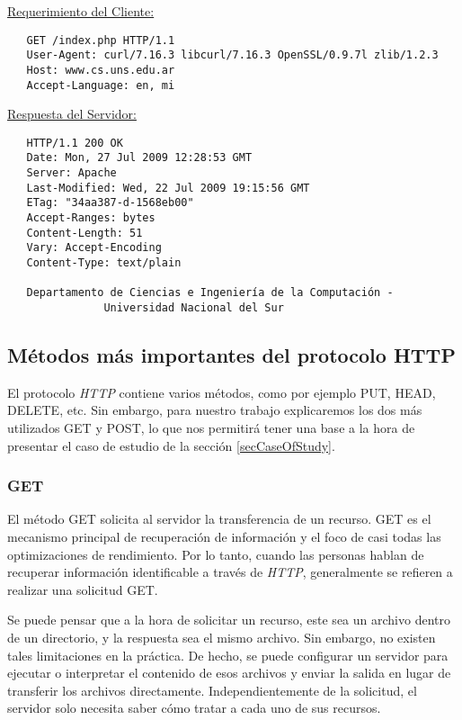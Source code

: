 \bigskip
\noindent
\underline{Requerimiento del Cliente:}
\begin{verbatim}
   GET /index.php HTTP/1.1
   User-Agent: curl/7.16.3 libcurl/7.16.3 OpenSSL/0.9.7l zlib/1.2.3
   Host: www.cs.uns.edu.ar
   Accept-Language: en, mi
  \end{verbatim}
\underline{Respuesta del Servidor:}
\begin{verbatim}
   HTTP/1.1 200 OK
   Date: Mon, 27 Jul 2009 12:28:53 GMT
   Server: Apache
   Last-Modified: Wed, 22 Jul 2009 19:15:56 GMT
   ETag: "34aa387-d-1568eb00"
   Accept-Ranges: bytes
   Content-Length: 51
   Vary: Accept-Encoding
   Content-Type: text/plain

   Departamento de Ciencias e Ingeniería de la Computación -
               Universidad Nacional del Sur
\end{verbatim}


\subsection{Métodos más importantes del protocolo HTTP}

El protocolo \emph{HTTP} contiene varios métodos, como por ejemplo PUT, HEAD, DELETE, etc. Sin
embargo, para nuestro trabajo explicaremos los dos más utilizados GET y POST, lo que
nos permitirá tener una base a la hora de presentar el caso de estudio de la 
sección \ref{secCaseOfStudy}.


\subsubsection*{GET}

El método GET solicita al servidor la transferencia de un recurso.
GET es el mecanismo principal de recuperación de información y el 
foco de casi todas las optimizaciones de rendimiento. Por lo tanto,
cuando las personas hablan de recuperar información identificable
a través de \emph{HTTP}, generalmente se refieren a realizar una solicitud
GET.

Se puede pensar que a la hora de solicitar un recurso, este sea un archivo 
dentro de un directorio, y la respuesta sea el mismo archivo. Sin embargo, 
no existen tales limitaciones en la práctica. De hecho, se puede 
configurar un servidor para ejecutar o interpretar el contenido de esos archivos y 
enviar la salida en lugar de transferir los archivos directamente. 
Independientemente de la solicitud, el servidor solo necesita saber 
cómo tratar a cada uno de sus recursos.


